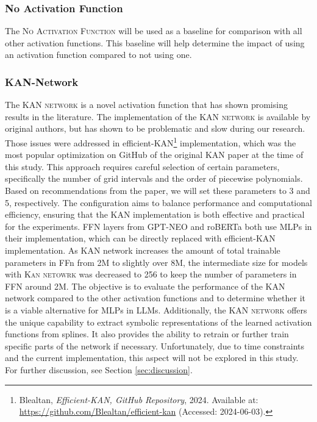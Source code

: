 \subsubsection{No Activation Function}
The \textsc{No Activation Function} will be used as a baseline for comparison with all other activation functions. This baseline will help determine the impact of using an activation function compared to not using one.

\subsubsection{KAN-Network}
The \textsc{KAN network} is a novel activation function that has shown promising results in the literature. The implementation of the \textsc{KAN network} is available by original authors, but has shown to be problematic and slow during our research. Those issues were addressed in efficient-KAN\footnote{\label{footnote:efficient-kan}Blealtan, \textit{Efficient-KAN, GitHub Repository}, 2024. Available at: \url{https://github.com/Blealtan/efficient-kan} (Accessed: 2024-06-03).} implementation, which was the most popular optimization on GitHub of the original KAN paper at the time of this study. This approach requires careful selection of certain parameters, specifically the number of grid intervals and the order of piecewise polynomials. Based on recommendations from the paper, we will set these parameters to 3 and 5, respectively. The configuration aims to balance performance and computational efficiency, ensuring that the KAN implementation is both effective and practical for the experiments. FFN layers from GPT-NEO and roBERTa both use MLPs in their implementation, which can be directly replaced with efficient-KAN implementation. As KAN network increases the amount of total trainable parameters in FFn from 2M to slightly over 8M, the intermediate size for models with \textsc{Kan netowrk} was decreased to 256 to keep the number of parameters in FFN around 2M.
The objective is to evaluate the performance of the KAN network compared to the other activation functions and to determine whether it is a viable alternative for MLPs in LLMs. Additionally, the \textsc{KAN network} offers the unique capability to extract symbolic representations of the learned activation functions from splines. It also provides the ability to retrain or further train specific parts of the network if necessary. Unfortunately, due to time constraints and the current implementation, this aspect will not be explored in this study. For further discussion, see Section \ref{sec:discussion}.